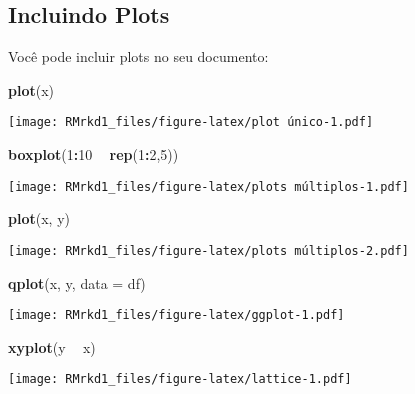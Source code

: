 \documentclass[]{article}
\newenvironment{Shaded}{\begin{snugshade}}{\end{snugshade}}
\newcommand{\KeywordTok}[1]{\textcolor[rgb]{0.13,0.29,0.53}{\textbf{#1}}}
\newcommand{\DataTypeTok}[1]{\textcolor[rgb]{0.13,0.29,0.53}{#1}}
\newcommand{\DecValTok}[1]{\textcolor[rgb]{0.00,0.00,0.81}{#1}}
\newcommand{\StringTok}[1]{\textcolor[rgb]{0.31,0.60,0.02}{#1}}
\newcommand{\OperatorTok}[1]{\textcolor[rgb]{0.81,0.36,0.00}{\textbf{#1}}}
\newcommand{\NormalTok}[1]{#1}
\begin{document}
\subsection{Incluindo Plots}\label{incluindo-plots}

Você pode incluir plots no seu documento:

\begin{Shaded}
\begin{Highlighting}[]
\KeywordTok{plot}\NormalTok{(x)}
\end{Highlighting}
\end{Shaded}

\texttt{[image: RMrkd1\_files/figure-latex/plot único-1.pdf]}

\begin{Shaded}
\begin{Highlighting}[]
\KeywordTok{boxplot}\NormalTok{(}\DecValTok{1}\OperatorTok{:}\DecValTok{10} \OperatorTok{~}\StringTok{ }\KeywordTok{rep}\NormalTok{(}\DecValTok{1}\OperatorTok{:}\DecValTok{2}\NormalTok{,}\DecValTok{5}\NormalTok{))}
\end{Highlighting}
\end{Shaded}

\texttt{[image: RMrkd1\_files/figure-latex/plots múltiplos-1.pdf]}

\begin{Shaded}
\begin{Highlighting}[]
\KeywordTok{plot}\NormalTok{(x, y)}
\end{Highlighting}
\end{Shaded}

\texttt{[image: RMrkd1\_files/figure-latex/plots múltiplos-2.pdf]}

\begin{Shaded}
\begin{Highlighting}[]
\KeywordTok{qplot}\NormalTok{(x, y, }\DataTypeTok{data =}\NormalTok{ df)}
\end{Highlighting}
\end{Shaded}

\texttt{[image: RMrkd1\_files/figure-latex/ggplot-1.pdf]}

\begin{Shaded}
\begin{Highlighting}[]
\KeywordTok{xyplot}\NormalTok{(y }\OperatorTok{~}\StringTok{ }\NormalTok{x)}
\end{Highlighting}
\end{Shaded}

\texttt{[image: RMrkd1\_files/figure-latex/lattice-1.pdf]}
\end{document}
